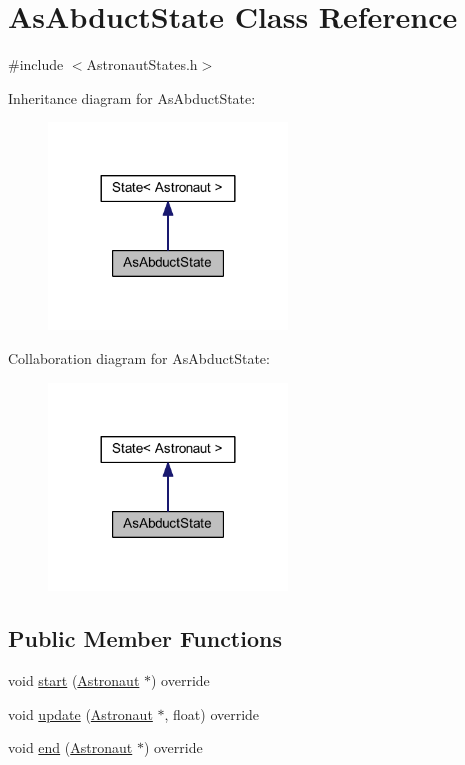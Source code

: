 \hypertarget{class_as_abduct_state}{}\section{As\+Abduct\+State Class Reference}
\label{class_as_abduct_state}


{\ttfamily \#include $<$Astronaut\+States.\+h$>$}



Inheritance diagram for As\+Abduct\+State\+:\nopagebreak
\begin{figure}[H]
\begin{center}
\leavevmode
\includegraphics[width=180pt]{class_as_abduct_state__inherit__graph}
\end{center}
\end{figure}


Collaboration diagram for As\+Abduct\+State\+:\nopagebreak
\begin{figure}[H]
\begin{center}
\leavevmode
\includegraphics[width=180pt]{class_as_abduct_state__coll__graph}
\end{center}
\end{figure}
\subsection*{Public Member Functions}
\begin{DoxyCompactItemize}
\item 
void \hyperlink{class_as_abduct_state_afad21e00707545b221d707932b22375e}{start} (\hyperlink{class_astronaut}{Astronaut} $\ast$) override
\item 
void \hyperlink{class_as_abduct_state_a5d1f94854fc9ef5e4cc35734ad691660}{update} (\hyperlink{class_astronaut}{Astronaut} $\ast$, float) override
\item 
void \hyperlink{class_as_abduct_state_a28ceb4aad2ec8dc1c07c584cf9f9778f}{end} (\hyperlink{class_astronaut}{Astronaut} $\ast$) override
\end{DoxyCompactItemize}
